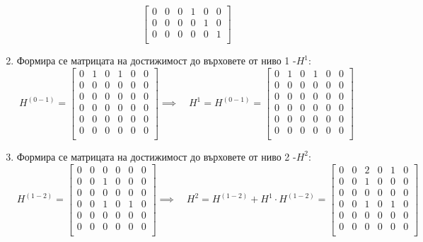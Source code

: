 \documentclass[fleqn, 12pt]{article}
\theoremstyle{definition}
\begin{document}
\begin{enumerate}
$$\begin{bmatrix}
0 & 0 & 0 & 1 & 0 & 0 \\
0 & 0 & 0 & 0 & 1 & 0 \\
0 & 0 & 0 & 0 & 0 & 1  \\
\end{bmatrix} 
$$
\item Формира се матрицата на достижимост до върховете от ниво 1 -$H^1$: 
$$
H^{(0-1)} = 
\begin{bmatrix}
0 & 1 & 0 & 1 & 0 & 0 \\
0 & 0 & 0 & 0 & 0 & 0 \\
0 & 0 & 0 & 0 & 0 & 0 \\
0 & 0 & 0 & 0 & 0 & 0 \\
0 & 0 & 0 & 0 & 0 & 0 \\
0 & 0 & 0 & 0 & 0 & 0  \\
\end{bmatrix}
\implies \quad 
H^1 = H^{(0-1)} = 
\begin{bmatrix}
0 & 1 & 0 & 1 & 0 & 0 \\
0 & 0 & 0 & 0 & 0 & 0 \\
0 & 0 & 0 & 0 & 0 & 0 \\
0 & 0 & 0 & 0 & 0 & 0 \\
0 & 0 & 0 & 0 & 0 & 0 \\
0 & 0 & 0 & 0 & 0 & 0  \\
\end{bmatrix}
$$
\item Формира се матрицата на достижимост до върховете от ниво 2 -$H^2$:
$$
H^{(1-2)} = 
\begin{bmatrix}
0 & 0 & 0 & 0 & 0 & 0 \\
0 & 0 & 1 & 0 & 0 & 0 \\
0 & 0 & 0 & 0 & 0 & 0 \\
0 & 0 & 1 & 0 & 1 & 0 \\
0 & 0 & 0 & 0 & 0 & 0 \\
0 & 0 & 0 & 0 & 0 & 0  \\
\end{bmatrix}
\implies \quad 
H^2 = H^{(1-2)} + H^1 \cdot H^{(1-2)} = 
\begin{bmatrix}
0 & 0 & 2 & 0 & 1 & 0 \\
0 & 0 & 1 & 0 & 0 & 0 \\
0 & 0 & 0 & 0 & 0 & 0 \\
0 & 0 & 1 & 0 & 1 & 0 \\
0 & 0 & 0 & 0 & 0 & 0 \\
0 & 0 & 0 & 0 & 0 & 0  \\
\end{bmatrix}
$$
\end{enumerate}
\end{document}
